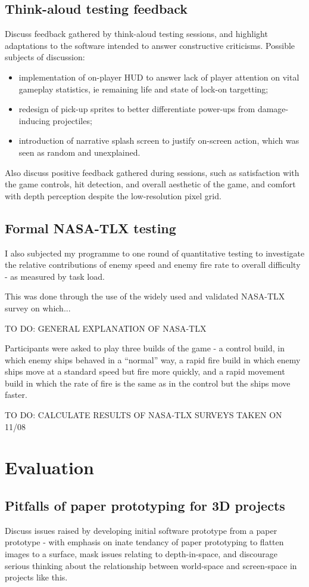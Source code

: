\documentclass{article}
\begin{document}
\subsection{Think-aloud testing feedback}
Discuss feedback gathered by think-aloud testing sessions, and highlight adaptations
to the software intended to answer constructive criticisms. Possible subjects of
discussion:
\begin{itemize}
   \item implementation of on-player HUD to answer lack of player attention on vital
   gameplay statistics, ie remaining life and state of lock-on targetting;
   \item redesign of pick-up sprites to better differentiate power-ups from
   damage-inducing projectiles;
   \item introduction of narrative splash screen to justify on-screen action, which
   was seen as random and unexplained.
\end{itemize}
Also discuss positive feedback gathered during sessions, such as satisfaction
with the game controls, hit detection, and overall aesthetic of the game, and comfort
with depth perception despite the low-resolution pixel grid.
\subsection{Formal NASA-TLX testing}
I also subjected my programme to one round of quantitative testing to investigate the
relative contributions of enemy speed and enemy fire rate to overall difficulty - as
measured by task load.

This was done through the use of the widely used and validated NASA-TLX survey on which...

TO DO: GENERAL EXPLANATION OF NASA-TLX

Participants were asked to play three builds of the game - a control build, in which enemy
ships behaved in a ``normal'' way, a rapid fire build in which enemy ships move at a standard
speed but fire more quickly, and a rapid movement build in which the rate of fire is the same
as in the control but the ships move faster.

TO DO: CALCULATE RESULTS OF NASA-TLX SURVEYS TAKEN ON 11/08


\section{Evaluation}
\subsection{Pitfalls of paper prototyping for 3D projects}
Discuss issues raised by developing initial software prototype from a paper prototype
- with emphasis on inate tendancy of paper prototyping to flatten images to a surface,
mask issues relating to depth-in-space, and discourage serious thinking about the
relationship between world-space and screen-space in projects like this.
\end{document}
